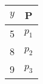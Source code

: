 \begin{tabular}{|c|c|}
\hline
 $y$ & P     \\ \hline
5 & $p_1$ \\ \hline
8 & $p_2$ \\ \hline
9 & $p_3$ \\ \hline
\end{tabular}
